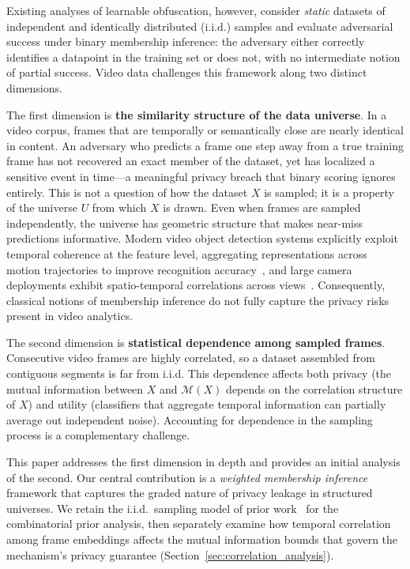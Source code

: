 \documentclass[letterpaper]{article} %
\begin{document}
Existing analyses of learnable obfuscation, however, consider \emph{static} datasets of independent and identically distributed (i.i.d.) samples and evaluate adversarial success under binary membership inference: the adversary either correctly identifies a datapoint in the training set or does not, with no intermediate notion of partial success. Video data challenges this framework along two distinct dimensions.

The first dimension is \textbf{the similarity structure of the data universe}. In a video corpus, frames that are temporally or semantically close are nearly identical in content. An adversary who predicts a frame one step away from a true training frame has not recovered an exact member of the dataset, yet has localized a sensitive event in time---a meaningful privacy breach that binary scoring ignores entirely. This is not a question of how the dataset $X$ is sampled; it is a property of the universe $U$ from which $X$ is drawn. Even when frames are sampled independently, the universe has geometric structure that makes near-miss predictions informative. Modern video object detection systems explicitly exploit temporal coherence at the feature level, aggregating representations across motion trajectories to improve recognition accuracy~\cite{zhu2017flow}, and large camera deployments exhibit spatio-temporal correlations across views~\cite{jain2019scaling}. Consequently, classical notions of membership inference do not fully capture the privacy risks present in video analytics.

The second dimension is \textbf{statistical dependence among sampled frames}. Consecutive video frames are highly correlated, so a dataset assembled from contiguous segments is far from i.i.d. This dependence affects both privacy (the mutual information between $X$ and $\mathcal{M}(X)$ depends on the correlation structure of $X$) and utility (classifiers that aggregate temporal information can partially average out independent noise). Accounting for dependence in the sampling process is a complementary challenge.

This paper addresses the first dimension in depth and provides an initial analysis of the second. Our central contribution is a \emph{weighted membership inference} framework that captures the graded nature of privacy leakage in structured universes. We retain the i.i.d.\ sampling model of prior work~\cite{xiao2024formal} for the combinatorial prior analysis, then separately examine how temporal correlation among frame embeddings affects the mutual information bounds that govern the mechanism's privacy guarantee (Section~\ref{sec:correlation_analysis}).
\end{document}
